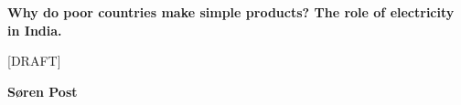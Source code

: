 \begin{titlepage}
   \begin{center}
       \vspace*{1cm}

       \textbf{Why do poor countries make simple products? The role of electricity in India.}

       \vspace{0.5cm}
        [DRAFT]

       \vspace{1.5cm}

       \textbf{Søren Post}

       \vfill


       \vspace{0.8cm}



   \end{center}
\end{titlepage}

